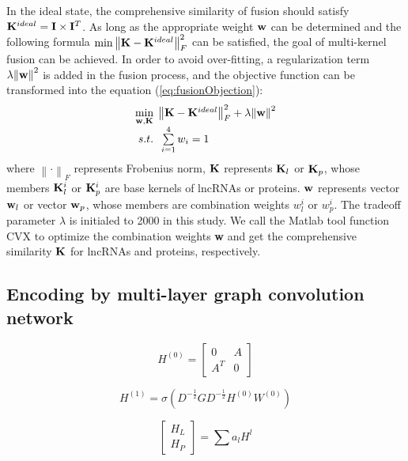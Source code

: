 \documentclass[fleqn,10pt]{wlscirep}
\begin{document}
In the ideal state, the comprehensive similarity of fusion should satisfy ${{\bf{K}}^{ideal}} = {\bf{I}}\times{{\bf{I}}^T}$. As long as the appropriate weight ${\bf{w}}$ can be determined and the following formula $\min \left\| {{\bf{K}} - {{\bf{K}}^{ideal}}} \right\|_F^2$ can be satisfied, the goal of multi-kernel fusion can be achieved. In order to avoid over-fitting, a regularization term $\lambda {\left\| {\bf{w}} \right\|^2}$ is added in the fusion process, and the objective function can be transformed into the equation (\ref{eq:fusionObjection}):
\begin{equation}\label{eq:fusionObjection}
\begin{array}{l}
\mathop {\min }\limits_{{\bf{w,K}}} \;\left\| {{\bf{K}} - {{\bf{K}}^{ideal}}} \right\|_F^2 + \lambda {\left\| {\bf{w}} \right\|^2}\\
\;s.t.\;\;\sum\limits_{i = 1}^4 {{w_i}}  = 1
\end{array}
\end{equation}
where ${\left\|  \cdot  \right\|_F}$ represents Frobenius norm, ${\bf{K}}$ represents ${{\bf{K}}_l}$ or ${{\bf{K}}_p}$, whose members ${{\bf{K}}_l^i}$ or ${{\bf{K}}_p^i}$ are base kernels of lncRNAs or proteins. ${\bf{w}}$ represents vector ${{\bf{w}}_l}$ or vector ${{\bf{w}}_p}$, whose members are combination weights $w_l^i$ or $w_p^i$. The tradeoff parameter $\lambda$ is initialed to 2000 in this study. We call the Matlab tool function CVX to optimize the combination weights {\bf{w}} and get the comprehensive similarity ${\bf{K}}$ for lncRNAs and proteins, respectively.  

\subsection*{Encoding by multi-layer graph convolution network}

\begin{equation}
{H^{(0)}} = \left[ {\begin{array}{*{20}{c}}
0&A\\
{{A^T}}&0
\end{array}} \right]
\end{equation}

\begin{equation}
{H^{(1)}} = \sigma ({D^{ - \frac{1}{2}}}G{D^{ - \frac{1}{2}}}{H^{(0)}}{W^{(0)}})
\end{equation}

\begin{equation}
\left[ {\begin{array}{*{20}{c}}
{{H_L}}\\
{{H_P}}
\end{array}} \right] = \sum {{a_l}{H^l}}
\end{equation}
\end{document}
